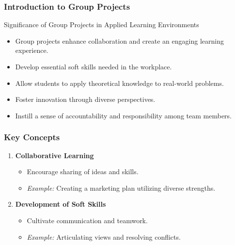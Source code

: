 \documentclass[aspectratio=169]{beamer}
\begin{document}
\begin{frame}[fragile]
    \frametitle{Introduction to Group Projects}
    \begin{block}{Significance of Group Projects in Applied Learning Environments}
        \begin{itemize}
            \item Group projects enhance collaboration and create an engaging learning experience.
            \item Develop essential soft skills needed in the workplace.
            \item Allow students to apply theoretical knowledge to real-world problems.
            \item Foster innovation through diverse perspectives.
            \item Instill a sense of accountability and responsibility among team members.
        \end{itemize}
    \end{block}
\end{frame}

\begin{frame}[fragile]
    \frametitle{Key Concepts}
    \begin{enumerate}
        \item \textbf{Collaborative Learning}
            \begin{itemize}
                \item Encourage sharing of ideas and skills.
                \item \textit{Example:} Creating a marketing plan utilizing diverse strengths.
            \end{itemize}
        \item \textbf{Development of Soft Skills}
            \begin{itemize}
                \item Cultivate communication and teamwork.
                \item \textit{Example:} Articulating views and resolving conflicts.
            \end{itemize}
    \end{enumerate}
\end{frame}
\end{document}

